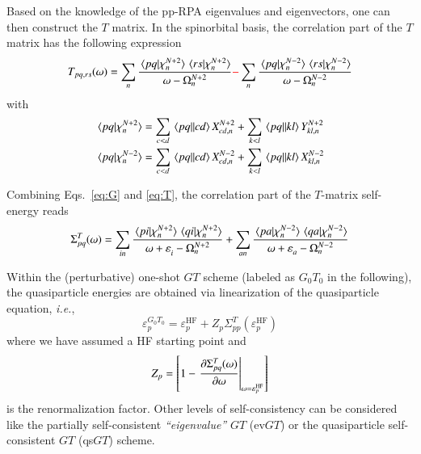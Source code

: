 \documentclass[aip,jcp,reprint,noshowkeys,superscriptaddress]{revtex4-1}
\newcommand{\ie}{\textit{i.e.}}
\newcommand{\titou}[1]{\textcolor{red}{#1}}
\newcommand{\HF}{\text{HF}}
\newcommand{\e}[2]{\eps_{#1}^{#2}}
\newcommand{\Om}[2]{\Omega_{#1}^{#2}}
\newcommand{\eps}{\varepsilon}
\begin{document}
Based on the knowledge of the pp-RPA eigenvalues and eigenvectors, one can then construct the $T$ matrix.
In the spinorbital basis, the correlation part of the $T$ matrix has the following expression
\begin{equation}
\label{eq:T}
	T_{pq,rs}(\omega) 
		= \sum_{n} \frac{\braket*{pq}{\chi_n^{N+2}}\braket*{rs}{\chi_n^{N+2}}}{\omega - \Om{n}{N+2}}
		\titou{-} \sum_{n} \frac{\braket*{pq}{\chi_n^{N-2}}\braket*{rs}{\chi_n^{N-2}}}{\omega - \Om{n}{N-2}}
\end{equation}
with
\begin{subequations}
\begin{align}
	\braket*{pq}{\chi_n^{N+2}} & = \sum_{c < d} \mel{pq}{}{cd} X_{cd,n}^{N+2} + \sum_{k < l}  \mel{pq}{}{kl} Y_{kl,n}^{N+2}
	\\
	\braket*{pq}{\chi_n^{N-2}} & = \sum_{c < d} \mel{pq}{}{cd} X_{cd,n}^{N-2} + \sum_{k < l}  \mel{pq}{}{kl} X_{kl,n}^{N-2}
\end{align}
\end{subequations}

Combining Eqs.~\eqref{eq:G} and \eqref{eq:T}, the correlation part of the $T$-matrix self-energy reads \cite{Zhang_2017}
\begin{equation}
	\Sigma^{T}_{pq}(\omega)
	= \sum_{in} \frac{\braket*{pi}{\chi_n^{N+2}}\braket*{qi}{\chi_n^{N+2}}}{\omega + \e{i}{} - \Om{n}{N+2}}
	+ \sum_{an} \frac{\braket*{pa}{\chi_n^{N-2}}\braket*{qa}{\chi_n^{N-2}}}{\omega + \e{a}{} - \Om{n}{N-2}}
\end{equation}

Within the (perturbative) one-shot $GT$ scheme (labeled as $G_0T_0$ in the following), the quasiparticle energies are obtained via linearization of the quasiparticle equation, \ie,
\begin{equation}
	\e{p}{G_0T_0} = \e{p}{\HF} + Z_p \Sigma^{T}_{pp}(\e{p}{\HF})
\end{equation}
where we have assumed a HF starting point and
\begin{equation}
	Z_p = \qty[ 1 - \eval{\pdv{\Sigma^{T}_{pq}(\omega)}{\omega}}_{\omega = \e{p}{\HF}} ]
\end{equation}
is the renormalization factor.
Other levels of self-consistency can be considered like the partially self-consistent \textit{``eigenvalue''} $GT$ (ev$GT$) or the quasiparticle self-consistent $GT$ (qs$GT$) scheme.
\end{document}
